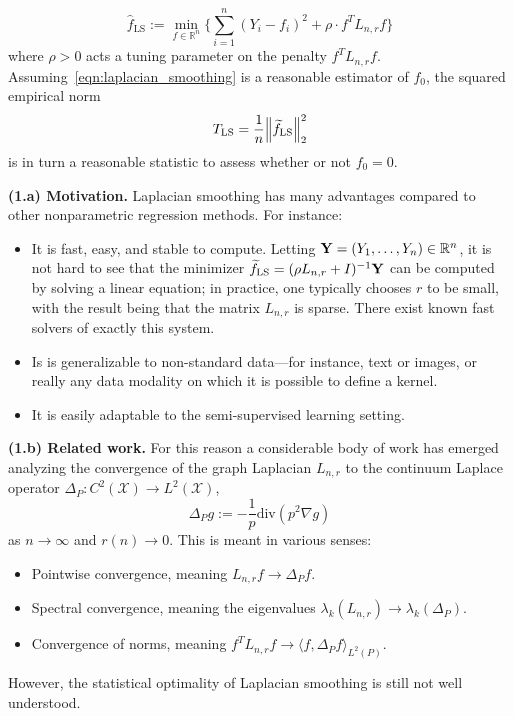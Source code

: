 \documentclass{article}
\newcommand{\Reals}{\mathbb{R}}
\newcommand{\1}{\mathbf{1}}
\newcommand{\Lap}{L}
\newcommand{\Xset}{\mathcal{X}}
\newcommand{\Leb}{L}
\newcommand{\dive}{\mathrm{div}}
\newcommand{\wt}[1]{\widetilde{#1}}
\newcommand{\wh}[1]{\widehat{#1}}
\newcommand{\LS}{\mathrm{LS}}
\theoremstyle{alden}
\theoremstyle{aldenthm}
\theoremstyle{definition}
\theoremstyle{remark}
\begin{document}
\begin{itemize}
	\begin{equation}
	\label{eqn:laplacian_smoothing}
	\wh{f}_{\LS} := \min_{f \in \Reals^n} \biggl\{\sum_{i = 1}^{n}(Y_i - f_i)^2 + \rho \cdot f^T \Lap_{n,r} f \biggr\}
	\end{equation}
	where $\rho > 0$ acts a tuning parameter on the penalty $f^T \Lap_{{n,r}} f$.
	Assuming~\eqref{eqn:laplacian_smoothing} is a reasonable estimator of $f_0$, the squared empirical norm
	\begin{equation}
	T_{\LS} = \frac{1}{n}\Bigl\|\wt{f}_{\LS}\Bigr\|_2^2 \label{eqn:laplacian_smoothing_test}
	\end{equation}
	is in turn a reasonable statistic to assess whether or not $f_0 = 0$. 
\end{itemize}

\textbf{(1.a) Motivation.} Laplacian smoothing has many advantages compared to other nonparametric regression methods. For instance:

\begin{itemize}
	\item It is fast, easy, and stable to compute. Letting ${\bf Y} = (Y_1,\ldots,Y_n) \in \Reals^n$, it is not hard to see that the minimizer $\wt{f}_{\LS} = (\rho \Lap_{n,r} + I)^{-1}{\bf Y}$ can be computed by solving a linear equation; in practice, one typically chooses $r$ to be small, with the result being that the matrix $\Lap_{n,r}$ is sparse. There exist known fast solvers of exactly this system.
	\item Is is generalizable to non-standard data---for instance, text or images, or really any data modality on which it is possible to define a kernel.
	\item It is easily adaptable to the semi-supervised learning setting. 
\end{itemize}

\textbf{(1.b) Related work.} For this reason a considerable body of work has emerged analyzing the convergence of the graph Laplacian $\Lap_{{n,r}}$ to the continuum Laplace operator $\Delta_P: C^2(\Xset) \to \Leb^2(\Xset)$,
\begin{equation}
\label{eqn:laplace_operator}
\Delta_Pg := -\frac{1}{p} \dive(p^2 \nabla g)
\end{equation}
as $n \to \infty$ and $r(n) \to 0$. This is meant in various senses:
\begin{itemize}
	\item Pointwise convergence, meaning $\Lap_{n,r}f \to \Delta_Pf$. 
	\item Spectral convergence, meaning the eigenvalues $\lambda_k(\Lap_{n,r}) \to \lambda_k(\Delta_P)$.
	\item Convergence of norms, meaning $f^T \Lap_{n,r} f \to \langle f,\Delta_Pf \rangle_{\Leb^2(P)}$. 
\end{itemize}
However, the statistical optimality of Laplacian smoothing is still not well understood.
\end{document}
